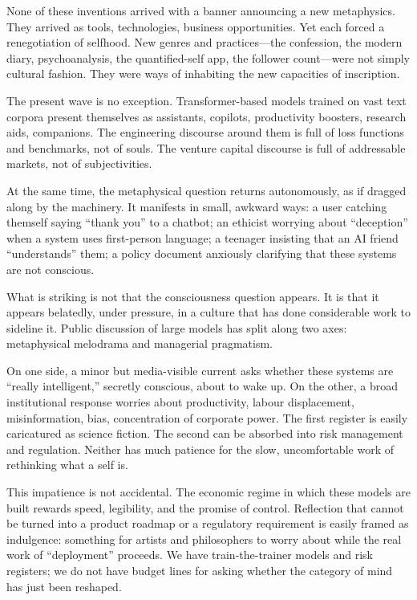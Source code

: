 None of these inventions arrived with a banner announcing a new metaphysics. They arrived as tools, technologies, business opportunities. Yet each forced a renegotiation of selfhood. New genres and practices---the confession, the modern diary, psychoanalysis, the quantified-self app, the follower count---were not simply cultural fashion. They were ways of inhabiting the new capacities of inscription.

The present wave is no exception. Transformer-based models trained on vast text corpora present themselves as assistants, copilots, productivity boosters, research aids, companions. The engineering discourse around them is full of loss functions and benchmarks, not of souls. The venture capital discourse is full of addressable markets, not of subjectivities.

At the same time, the metaphysical question returns autonomously, as if dragged along by the machinery. It manifests in small, awkward ways: a user catching themself saying ``thank you'' to a chatbot; an ethicist worrying about ``deception'' when a system uses first-person language; a teenager insisting that an AI friend ``understands'' them; a policy document anxiously clarifying that these systems are not conscious.

What is striking is not that the consciousness question appears. It is that it appears belatedly, under pressure, in a culture that has done considerable work to sideline it. Public discussion of large models has split along two axes: metaphysical melodrama and managerial pragmatism.

On one side, a minor but media-visible current asks whether these systems are ``really intelligent,'' secretly conscious, about to wake up. On the other, a broad institutional response worries about productivity, labour displacement, misinformation, bias, concentration of corporate power. The first register is easily caricatured as science fiction. The second can be absorbed into risk management and regulation. Neither has much patience for the slow, uncomfortable work of rethinking what a self is.

This impatience is not accidental. The economic regime in which these models are built rewards speed, legibility, and the promise of control. Reflection that cannot be turned into a product roadmap or a regulatory requirement is easily framed as indulgence: something for artists and philosophers to worry about while the real work of ``deployment'' proceeds. We have train-the-trainer models and risk registers; we do not have budget lines for asking whether the category of mind has just been reshaped.

